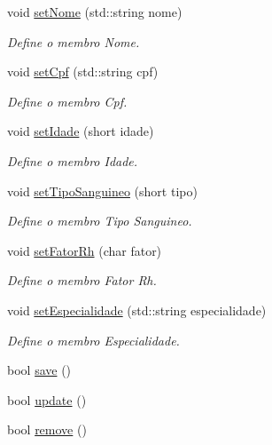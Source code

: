 \begin{DoxyCompactItemize}
void \hyperlink{classFuncionario_a32e01bd23e422ab7598cd04dac51eb82}{set\+Nome} (std\+::string nome)
\begin{DoxyCompactList}\small\item\em Define o membro Nome. \end{DoxyCompactList}\item 
void \hyperlink{classFuncionario_a4fd103578189cdce84cd0f76f6c668fd}{set\+Cpf} (std\+::string cpf)
\begin{DoxyCompactList}\small\item\em Define o membro Cpf. \end{DoxyCompactList}\item 
void \hyperlink{classFuncionario_af85eeb2e2b606d60da800c7084f23769}{set\+Idade} (short idade)
\begin{DoxyCompactList}\small\item\em Define o membro Idade. \end{DoxyCompactList}\item 
void \hyperlink{classFuncionario_a3e690d80c156f121598a28fb41de7aa1}{set\+Tipo\+Sanguineo} (short tipo)
\begin{DoxyCompactList}\small\item\em Define o membro Tipo Sanguineo. \end{DoxyCompactList}\item 
void \hyperlink{classFuncionario_aa8a9bab437eb41578fe514f26c16e5d2}{set\+Fator\+Rh} (char fator)
\begin{DoxyCompactList}\small\item\em Define o membro Fator Rh. \end{DoxyCompactList}\item 
void \hyperlink{classFuncionario_ae412312aaaaceaca6dd132e8397b283f}{set\+Especialidade} (std\+::string especialidade)
\begin{DoxyCompactList}\small\item\em Define o membro Especialidade. \end{DoxyCompactList}\item 
bool \hyperlink{classFuncionario_acb246ecc22f9135f2adad51a131ea45c}{save} ()
\item 
bool \hyperlink{classFuncionario_a72916b5b2b096630ebc93e4301ee7437}{update} ()
\item 
bool \hyperlink{classFuncionario_a0ea198bfb72865e5e0bf913c62020275}{remove} ()
\end{DoxyCompactItemize}
